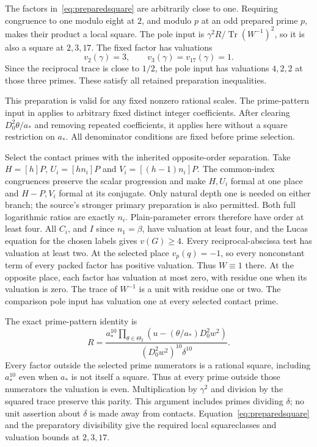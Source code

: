 \documentclass[11pt,a4paper]{article}
\DeclareMathOperator{\Tr}{Tr}\DeclareMathOperator{\Nm}{Nm}
\begin{document}
The factors in~\eqref{eq:preparedsquare} are arbitrarily close to one.
Requiring congruence to one modulo eight at $2$, and modulo $p$ at an odd
prepared prime $p$, makes their product a local square. The pole input
is $\gamma^2R/\Tr(W^{-1})^2$, so it is also a square at $2,3,17$.
The fixed factor has valuations
\[
 v_2(\gamma)=3,\qquad v_3(\gamma)=v_{17}(\gamma)=1.
\]
Since the reciprocal trace is close to $1/2$, the pole input has
valuations $4,2,2$ at those three primes. These satisfy all retained
preparation inequalities.

This preparation is valid for any fixed nonzero rational scales.
The prime-pattern input in \cite{Selection,Dependencies} applies to
arbitrary fixed distinct integer coefficients. After clearing
$D_0^2\theta/a_*$ and removing repeated coefficients, it applies
here without a square restriction on $a_*$. All denominator
conditions are fixed before prime selection.

Select the contact primes with the inherited opposite-order separation.
Take $H=[h]P$, $U_i=[hn_i]P$ and $V_i=[(h-1)n_i]P$.
The common-index congruences preserve the scalar progression and make
$H,U_i$ formal at one place and $H-P,V_i$ formal at its conjugate.
Only natural depth one is needed on either branch; the source's stronger
primary preparation is also permitted. Both full logarithmic ratios
are exactly $n_i$. Plain-parameter errors therefore have order at least
four. All $C_i$, and $I$ since $n_1=\beta$, have valuation at least four,
and the Lucas equation for the chosen labels gives $v(G)\ge4$.
Every reciprocal-abscissa test has valuation at least two.
At the selected place $v_p(q)=-1$, so every nonconstant term of every
packed factor has positive valuation. Thus $W\equiv1$ there. At the
opposite place, each factor has valuation at most zero, with residue one
when its valuation is zero. The trace of $W^{-1}$ is a unit with residue
one or two. The comparison pole input has valuation one at every
selected contact prime.

The exact prime-pattern identity is
\[
 R=\frac{\displaystyle a_*^{10}\prod_{\theta\in\Theta_2}
          (u-(\theta/a_*)D_0^2w^2)}
        {(D_0^2w^2)^{10}\delta^{10}}.
\]
Every factor outside the selected prime numerators is a rational
square, including $a_*^{10}$ even when $a_*$ is not itself a square.
Thus at every prime outside those numerators the valuation is even. Multiplication by $\gamma^2$ and division by the squared trace preserve this parity. This argument includes primes dividing $\delta$;
no unit assertion about $\delta$ is made away from contacts.
Equation~\eqref{eq:preparedsquare} and the preparatory divisibility
give the required local squareclasses and valuation bounds at $2,3,17$.
\end{document}
